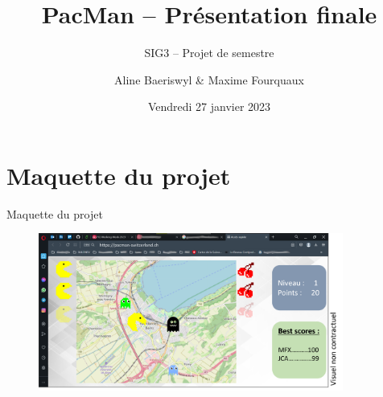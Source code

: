 \documentclass{beamer}
\title{PacMan -- Présentation finale}
\subtitle{SIG3 -- Projet de semestre}
\author{Aline Baeriswyl \& Maxime Fourquaux}
\date{Vendredi 27 janvier 2023}
\institute[HEIG]%
{
    HEIG-VD  -- EC+G \\
    Orientation GGT
}
\begin{document}
\frame{\titlepage}


\section{Maquette du projet}
\begin{frame}{Maquette du projet}
    \begin{figure}
        \centering
        \includegraphics[width=10cm]{maquette.png}
    \end{figure}
\end{frame}
\end{document}
